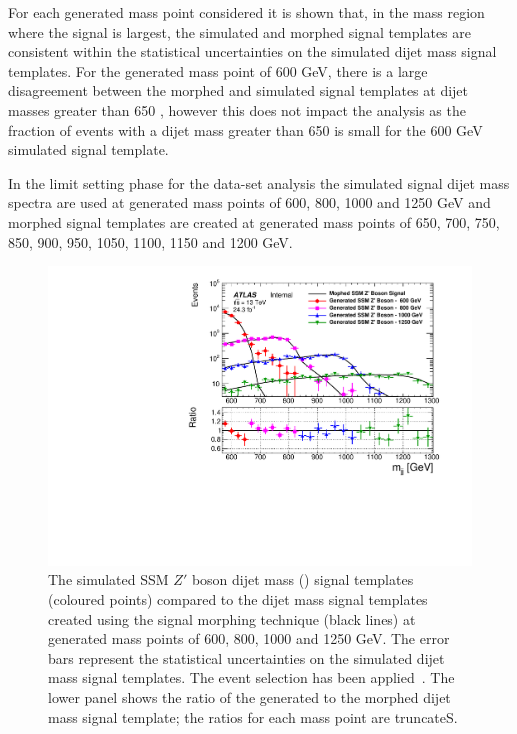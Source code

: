For each generated mass point considered it is shown that,
in the mass region where the signal is largest,
the simulated and morphed signal templates are consistent within the
statistical uncertainties on the simulated dijet mass signal templates.
For the generated mass point of 600 GeV,
there is a large disagreement between the morphed and simulated signal templates at dijet masses greater than 650 \GeV,
however this does not impact the analysis as the fraction of events with a dijet mass greater than 650 \GeV is small for the 600 GeV simulated signal template.

In the limit setting phase for the \lm{} data-set analysis
the simulated signal dijet mass spectra are used at generated mass points of 600, 800, 1000 and 1250 GeV and
morphed signal templates are created at generated mass points of 650, 700, 750, 850, 900, 950, 1050, 1100, 1150 and 1200 GeV.

\begin{figure}[!htb]
  \vspace{-1.2em}
\begin{center}
  \includegraphics[width=0.8\linewidth, angle=0]{figs/Dibjet/LowMass/lim-morphing_mine.pdf} 
\end{center}
\vspace{-2em}
\caption[Simulated SSM $Z'$ boson dijet mass signal templates and dijet mass signal templates
  created using the signal morphing technique used in the \lm{} data-set limit setting phase.]
        {The simulated SSM $Z'$ boson dijet mass (\mjj) signal templates (coloured points) compared to the
          dijet mass signal templates created using the signal morphing technique (black lines)
          at generated mass points of 600, 800, 1000 and 1250 GeV.
          The error bars represent the statistical uncertainties on the simulated dijet mass signal templates.
          The \lm{} event selection has been applied~\cite{dibjet-full}.
          The lower panel shows the ratio of the generated to the morphed dijet mass signal template; the ratios for each mass point are truncateS.
          \label{fig:lim-full_morphing}}
\end{figure}

